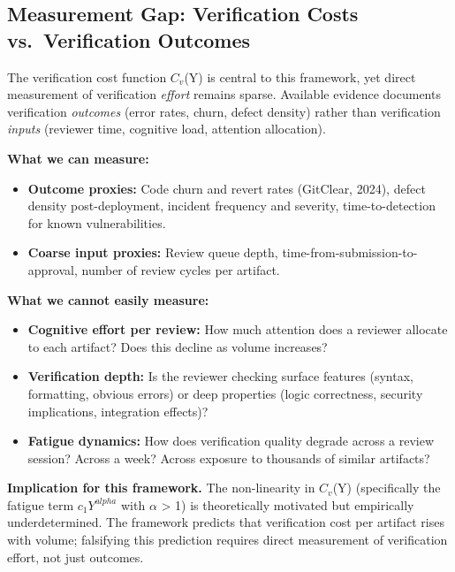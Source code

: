 \documentclass[11pt,a4paper]{article}
\providecommand{\tightlist}{\setlength{\itemsep}{0pt}\setlength{\parskip}{0pt}}
\begin{document}
\hypertarget{measurement-gap-verification-costs-vs.-verification-outcomes}{%
\subsection{ Measurement Gap: Verification Costs vs.~Verification Outcomes}\label{measurement-gap-verification-costs-vs.-verification-outcomes}}

The verification cost function $C_v$(Y) is central to this framework, yet direct measurement of verification \emph{effort} remains sparse. Available evidence documents verification \emph{outcomes} (error rates, churn, defect density) rather than verification \emph{inputs} (reviewer time, cognitive load, attention allocation).

\textbf{What we can measure:}

\begin{itemize}
\tightlist
\item
  \textbf{Outcome proxies:} Code churn and revert rates (GitClear, 2024), defect density post-deployment, incident frequency and severity, time-to-detection for known vulnerabilities.
\item
  \textbf{Coarse input proxies:} Review queue depth, time-from-submission-to-approval, number of review cycles per artifact.
\end{itemize}

\textbf{What we cannot easily measure:}

\begin{itemize}
\tightlist
\item
  \textbf{Cognitive effort per review:} How much attention does a reviewer allocate to each artifact? Does this decline as volume increases?
\item
  \textbf{Verification depth:} Is the reviewer checking surface features (syntax, formatting, obvious errors) or deep properties (logic correctness, security implications, integration effects)?
\item
  \textbf{Fatigue dynamics:} How does verification quality degrade across a review session? Across a week? Across exposure to thousands of similar artifacts?
\end{itemize}

\textbf{Implication for this framework.} The non-linearity in $C_v$(Y) (specifically the fatigue term $c_1 Y^{alpha}$ with $\alpha$ > 1) is theoretically motivated but empirically underdetermined. The framework predicts that verification cost per artifact rises with volume; falsifying this prediction requires direct measurement of verification effort, not just outcomes.
\end{document}
